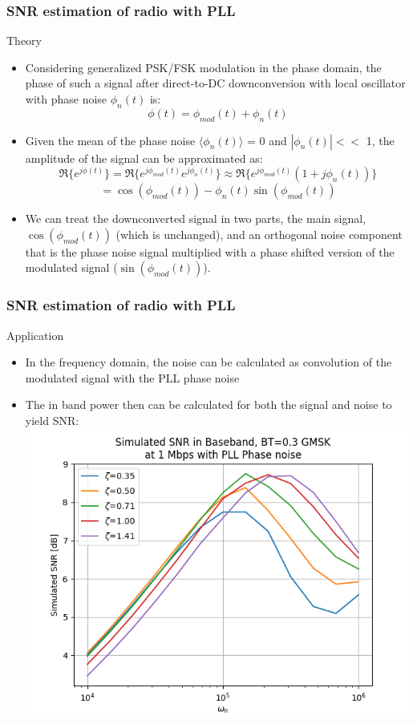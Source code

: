 \documentclass[t, screen, aspectratio=43]{beamer}
\begin{document}
\begin{frame}
	\frametitle{SNR estimation of radio with PLL}
	\begin{block}{Theory}
		\begin{itemize}
		\footnotesize
		\item Considering generalized PSK/FSK modulation in the phase domain, the phase of such a signal after direct-to-DC downconversion with local oscillator with phase noise $\phi_n(t)$ is:
		\begin{equation}
		\phi(t) = \phi_{mod}(t) + \phi_n(t)
		\end{equation}
		\item Given the mean of the phase noise $\langle\phi_n(t)\rangle$ = 0 and $|\phi_n(t)| <<$ 1, the amplitude of the signal can be approximated as:
		\begin{equation}
		\Re\{e^{j\phi(t)}\} = \Re\{e^{j\phi_{mod}(t)}e^{j\phi_n(t)}\} \approx \Re\{e^{j\phi_{mod}(t)}(1+j\phi_n(t))\}
		\end{equation}
		\begin{equation}
		= \cos(\phi_{mod}(t)) - \phi_n(t)\sin(\phi_{mod}(t))
		\end{equation}
		\item We can treat the downconverted signal in two parts, the main signal, $\cos(\phi_{mod}(t))$ (which is unchanged), and an orthogonal noise component that is the phase noise signal multiplied with a phase shifted version of the modulated signal ($\sin(\phi_{mod}(t))$). 
		\end{itemize}    
	\end{block}
\end{frame}


\begin{frame}
	\frametitle{SNR estimation of radio with PLL}
	\begin{block}{Application}
		\begin{itemize}
		\footnotesize
		\item In the frequency domain, the noise can be calculated as convolution of the modulated signal with the PLL phase noise
		\item The in band power then can be calculated for both the signal and noise to yield SNR:
		\center\includegraphics[width=0.5\linewidth]{snr.png}
		\end{itemize}    
	\end{block}
\end{frame}
\end{document}
